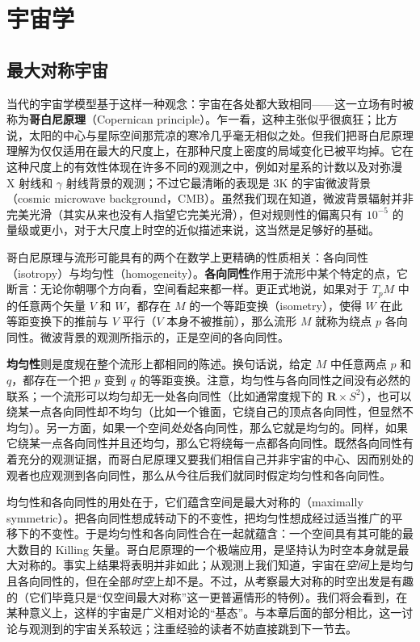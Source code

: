 
\chapter{宇宙学}

\section{最大对称宇宙}

当代的宇宙学模型基于这样一种观念：宇宙在各处都大致相同——这一立场有时被称为\textbf{哥白尼原理}（Copernican principle）。乍一看，这种主张似乎很疯狂；比方说，太阳的中心与星际空间那荒凉的寒冷几乎毫无相似之处。但我们把哥白尼原理理解为仅仅适用在最大的尺度上，在那种尺度上密度的局域变化已被平均掉。它在这种尺度上的有效性体现在许多不同的观测之中，例如对星系的计数以及对弥漫 X 射线和 $\gamma$ 射线背景的观测；不过它最清晰的表现是 3K 的宇宙微波背景（cosmic microwave background，CMB）。虽然我们现在知道，微波背景辐射并非完美光滑（其实从来也没有人指望它完美光滑），但对规则性的偏离只有 $10^{-5}$ 的量级或更小，对于大尺度上时空的近似描述来说，这当然是足够好的基础。

哥白尼原理与流形可能具有的两个在数学上更精确的性质相关：各向同性（isotropy）与均匀性（homogeneity）。\textbf{各向同性}作用于流形中某个特定的点，它断言：无论你朝哪个方向看，空间看起来都一样。更正式地说，如果对于 $T_pM$ 中的任意两个矢量 $V$ 和 $W$，都存在 $M$ 的一个等距变换（isometry），使得 $W$ 在此等距变换下的推前与 $V$ 平行（$V$ 本身不被推前），那么流形 $M$ 就称为绕点 $p$ 各向同性。微波背景的观测所指示的，正是空间的各向同性。

\textbf{均匀性}则是度规在整个流形上都相同的陈述。换句话说，给定 $M$ 中任意两点 $p$ 和 $q$，都存在一个把 $p$ 变到 $q$ 的等距变换。注意，均匀性与各向同性之间没有必然的联系；一个流形可以均匀却无一处各向同性（比如通常度规下的 $\mathbf{R}\times S^2$），也可以绕某一点各向同性却不均匀（比如一个锥面，它绕自己的顶点各向同性，但显然不均匀）。另一方面，如果一个空间\emph{处处}各向同性，那么它就是均匀的。同样，如果它绕某一点各向同性并且还均匀，那么它将绕每一点都各向同性。既然各向同性有着充分的观测证据，而哥白尼原理又要我们相信自己并非宇宙的中心、因而别处的观者也应观测到各向同性，那么从今往后我们就同时假定均匀性和各向同性。

均匀性和各向同性的用处在于，它们蕴含空间是最大对称的（maximally symmetric）。把各向同性想成转动下的不变性，把均匀性想成经过适当推广的平移下的不变性。于是均匀性和各向同性合在一起就蕴含：一个空间具有其可能的最大数目的 Killing 矢量。哥白尼原理的一个极端应用，是坚持认为时空本身就是最大对称的。事实上结果将表明并非如此；从观测上我们知道，宇宙在\emph{空间}上是均匀且各向同性的，但在全部\emph{时空}上却不是。不过，从考察最大对称的时空出发是有趣的（它们毕竟只是“仅空间最大对称”这一更普遍情形的特例）。我们将会看到，在某种意义上，这样的宇宙是广义相对论的“基态”。与本章后面的部分相比，这一讨论与观测到的宇宙关系较远；注重经验的读者不妨直接跳到下一节去。

